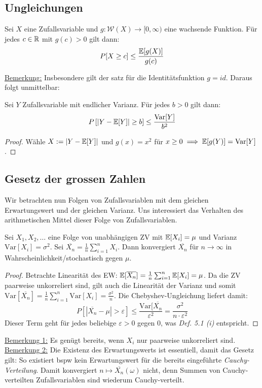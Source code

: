\subsection{Ungleichungen}
\begin{satz}
Sei $X$ eine Zufallsvariable und $g:\mathcal{W}(X)\to [0, \infty)$ eine wachsende Funktion. Für jedes $c \in \mathbb{R}$ mit $g(c) > 0$ gilt dann:
$$ P[X \geq c] \leq \frac{\mathbb{E}[g(X)]}{g(c)}$$
\end{satz}
\underline{Bemerkung:} Insbesondere gilt der satz für die Identitätsfunktion $g=id$. Daraus folgt unmittelbar:
\begin{satz}
Sei $Y$ Zufallsvariable mit endlicher Varianz. Für jedes $b>0$ gilt dann:
$$ P\left[ |Y-\mathbb{E}[Y]| \geq b \right] \leq \frac{\mathrm{Var}[Y]}{b^2}$$
\end{satz}
\begin{proof}
Wähle $X:=|Y-\mathbb{E}[Y]|$ und $g(x) =x^2 $ für $x\geq 0 \implies \mathbb{E}[g(Y)] = \mathrm{Var}[Y]$.
\end{proof}

\subsection{Gesetz der grossen Zahlen}
Wir betrachten nun Folgen von Zufallsvariablen mit dem gleichen Erwartungswert und der gleichen Varianz. Uns interessiert das Verhalten des arithmetischen Mittel dieser Folge von Zufallsvariablen.
\begin{satz}
Sei $X_1, X_2, \dots$ eine Folge von unabhängigen ZV mit $\mathbb{E}[X_i]= \mu $ und Varianz $\mathrm{Var}[X_i] = \sigma^2$. Sei $\overline{X_n} =\frac{1}{n}\sum_{i=1}^n X_i$. Dann konvergiert $\overline{X_n}$ für $n\to \infty$ in Wahrscheinlichkeit/stochastisch gegen $\mu$.
\end{satz}
\begin{proof}
Betrachte Linearität des EW: $\mathbb{E}[\overline{X_n}] = \frac{1}{n}\sum_{i=1}^n \mathbb{E}[X_i] = \mu$. Da die ZV paarweise unkorreliert sind, gilt auch die Linearität der Varianz und somit $\mathrm{Var}[\overline{X_n}] = \frac{1}{n}\sum_{i=1}^n \mathrm{Var}[X_i] = \frac{\sigma^2}{n}$. Die Chebyshev-Ungleichung liefert damit:
$$ P \left[ |\overline{X_n}-\mu|> \varepsilon \right] \leq \frac{\mathrm{Var}[\overline{X_n}}{\varepsilon^2} = \frac{\sigma^2}{n\cdot \varepsilon^2}$$
Dieser Term geht für jedes beliebige $\varepsilon>0$ gegen 0, was \textit{Def. 5.1 (i)} entspricht.
\end{proof}
\underline{Bemerkung 1:} Es genügt bereits, wenn $X_i$ nur paarweise unkorreliert sind.\\
\underline{Bemerkung 2:} Die Existenz des Erwartungswerts ist essentiell, damit das Gesetz gilt: So existiert bspw kein Erwartungswert für die bereits eingeführte \textit{Cauchy-Verteilung}. Damit konvergiert $n\mapsto \overline{X_n}(\omega)$ nicht, denn Summen von Cauchy-verteilten Zufallsvariablen sind wiederum Cauchy-verteilt.

